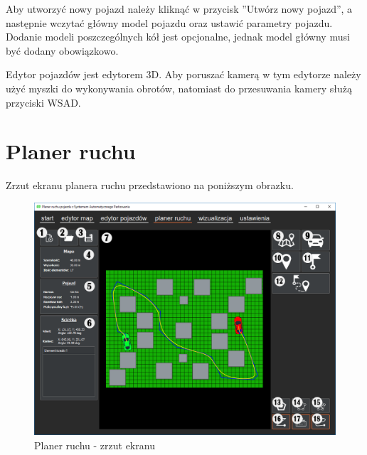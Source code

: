\documentclass[a4paper,11pt,twoside]{report}
\theoremstyle{definition}
\begin{document}
Aby utworzyć nowy pojazd należy kliknąć w przycisk ''Utwórz nowy pojazd'', a następnie wczytać główny model pojazdu oraz ustawić parametry pojazdu. Dodanie modeli poszczególnych kół jest opcjonalne, jednak model główny musi być dodany obowiązkowo.

Edytor pojazdów jest edytorem 3D. Aby poruszać kamerą w tym edytorze należy użyć myszki do wykonywania obrotów, natomiast do przesuwania kamery służą przyciski WSAD.

\section{Planer ruchu}

Zrzut ekranu planera ruchu przedstawiono na poniższym obrazku.

\begin{figure}[h!]
\centering
\includegraphics[scale=0.5]{instructionPathPlanner}
\caption[Planer ruchu - zrzut ekranu]{Planer ruchu - zrzut ekranu}
\end{figure}
\end{document}
